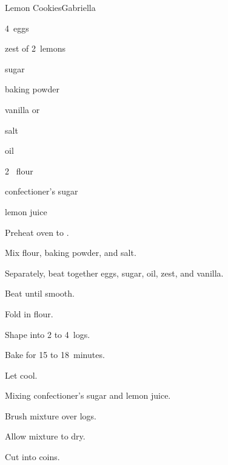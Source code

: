 \begin{recipe}{Lemon Cookies}{Gabriella}{}

\begin{ingredients}
\item 4~eggs
\item zest of 2~lemons
\item \C{\threequarter} sugar
\item {} baking powder
\item {} vanilla or 
\item \tp{\half} salt
\item \C{\threequarter} oil
\item 2~\C{2\half} flour
\item confectioner's sugar
\item lemon juice
\end{ingredients}

\begin{directions}
\item Preheat oven to .
\item Mix flour, baking powder, and salt.
\item Separately, beat together eggs, sugar, oil, zest, and vanilla.
\item Beat until smooth.
\item Fold in flour.
\item Shape into 2 to 4~logs.
\item Bake for 15 to 18~minutes.
\item Let cool.
\item Mixing confectioner's sugar and lemon juice.
\item Brush mixture over logs.
\item Allow mixture to dry.
\item Cut into coins.
\end{directions}

\end{recipe}
